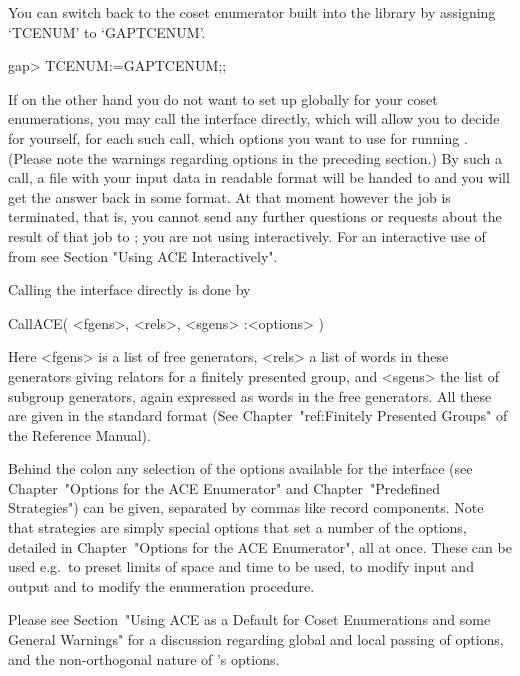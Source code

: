You can switch back  to the  coset enumerator  built into  the {\GAP}
library by assigning `TCENUM' to `GAPTCENUM'.

\begintt
gap> TCENUM:=GAPTCENUM;;
\endtt


If on  the other hand you  do not want  to set up {\ACE}  globally for
your coset  enumerations, you may call the  {\ACE} interface directly,
which will allow you to decide for yourself, for each such call, which
options you  want to use for running {\ACE}. (Please note the warnings
regarding options in the preceding section.)  By such a call,  a  file
with  your input  data in  {\ACE} readable  format will  be  handed to
{\ACE} and you will get the answer back in some {\GAP} format. At that
moment however the {\ACE} job  is terminated, that is, you cannot send
any  further questions or  requests about  the result  of that  job to
{\ACE}; you  are not using  {\ACE} interactively.  For  an interactive
use of {\ACE} from {\GAP} see Section "Using ACE Interactively".

Calling the {\ACE} interface directly is done by

\>CallACE( <fgens>, <rels>, <sgens> :<options> )

Here <fgens> is  a list of free generators, <rels> a  list of words in
these generators  giving relators for a finitely  presented group, and
<sgens> the list  of subgroup generators, again expressed  as words in
the free generators. All these are given in the standard {\GAP} format
(See Chapter~"ref:Finitely  Presented Groups" of  the {\GAP} Reference
Manual).

Behind  the colon  any  selection  of the  options  available for  the
interface     (see    Chapter~"Options for the ACE Enumerator"     and
Chapter~"Predefined Strategies")  can  be given,  separated  by commas 
like  record  components.  Note  that  strategies  are simply  special 
options   that   set   a   number   of   the   options,  detailed   in
Chapter~"Options for the ACE Enumerator",  all at once.  These  can be 
used e.g.~to preset limits of space and time  to be  used,  to  modify
input and output and to modify the enumeration procedure.

Please  see Section~"Using ACE as a Default for Coset Enumerations and 
some General Warnings" for a discussion  regarding  global  and  local
passing of options, and the non-orthogonal nature of {\ACE}'s options.

